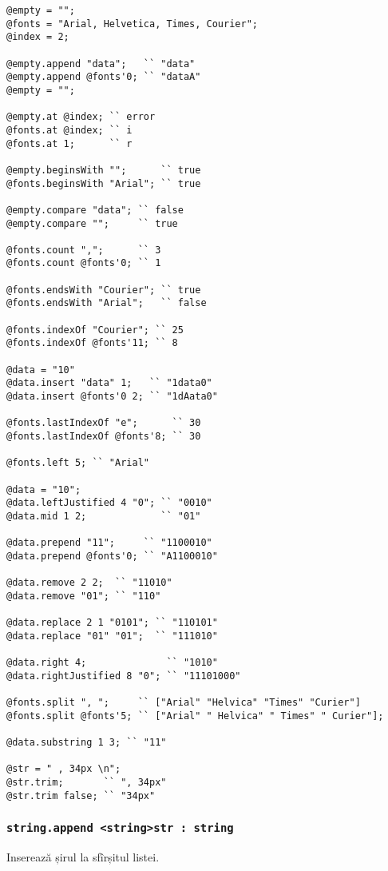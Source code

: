 \begin{lstlisting}[caption=Metodele clasei string, label=stringmethods]
@empty = "";
@fonts = "Arial, Helvetica, Times, Courier";
@index = 2;

@empty.append "data";   `` "data"
@empty.append @fonts'0; `` "dataA"
@empty = "";

@empty.at @index; `` error
@fonts.at @index; `` i
@fonts.at 1;	  `` r

@empty.beginsWith "";      `` true
@fonts.beginsWith "Arial"; `` true

@empty.compare "data"; `` false
@empty.compare "";     `` true

@fonts.count ",";      `` 3
@fonts.count @fonts'0; `` 1

@fonts.endsWith "Courier"; `` true
@fonts.endsWith "Arial";   `` false

@fonts.indexOf "Courier"; `` 25
@fonts.indexOf @fonts'11; `` 8

@data = "10"
@data.insert "data" 1;   `` "1data0"
@data.insert @fonts'0 2; `` "1dAata0"

@fonts.lastIndexOf "e";      `` 30
@fonts.lastIndexOf @fonts'8; `` 30

@fonts.left 5; `` "Arial"

@data = "10";
@data.leftJustified 4 "0"; `` "0010"
@data.mid 1 2;             `` "01"

@data.prepend "11";     `` "1100010"
@data.prepend @fonts'0; `` "A1100010"

@data.remove 2 2;  `` "11010"
@data.remove "01"; `` "110"

@data.replace 2 1 "0101"; `` "110101"
@data.replace "01" "01";  `` "111010"

@data.right 4; 				`` "1010"
@data.rightJustified 8 "0"; `` "11101000"

@fonts.split ", ";     `` ["Arial" "Helvica" "Times" "Curier"]
@fonts.split @fonts'5; `` ["Arial" " Helvica" " Times" " Curier"];

@data.substring 1 3; `` "11"

@str = " , 34px \n";
@str.trim;       `` ", 34px"
@str.trim false; `` "34px"
\end{lstlisting}

\subsubsection{\lstinline|string.append <string>str : string|}

Inserează șirul  la sfîrșitul listei.

